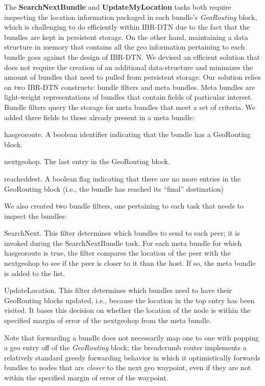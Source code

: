 The {\bf SearchNextBundle} and {\bf UpdateMyLocation} tasks both require inspecting the location information packaged in each bundle's {\em GeoRouting} block, which is challenging to do efficiently within IBR-DTN due to the fact that the bundles are kept in persistent storage. On the other hand, maintaining a data structure in memory that contains all the geo information pertaining to each bundle goes against the design of IBR-DTN. We devised an efficient solution that does not require the creation of an additional data-structure and minimizes the amount of bundles that need to pulled from persistent storage.  Our solution relies on two IBR-DTN constructs: {\sc bundle filters} and {\sc meta bundles}. {\sc Meta bundles} are light-weight representations of bundles that contain fields of particular interest. {\sc Bundle filters} query the storage for meta bundles that meet a set of criteria. We added three fields to those already present in a {\sc meta bundle}:
\begin{description*}
\item[hasgeoroute.] A boolean identifier indicating that the bundle has a {\sc GeoRouting} block.
\item[nextgeohop.] The last entry in the {\sc GeoRouting} block.
\item[reacheddest.] A boolean flag indicating that there are no more entries in the {\sc GeoRouting} block (i.e., the bundle has reached its ``final'' destination)
\end{description*}

We also created two {\sc bundle filters}, one pertaining to each task that needs to inspect the bundles:
\begin{description*}
\item[SearchNext.] This filter determines which bundles to send to each peer; it is invoked during the {\sc SearchNextBundle} task. For each {\sc meta bundle} for which {\sc hasgeoroute} is {\sc true}, the filter compares the location of the peer with the {\sc nextgeohop} to see if the peer is closer to it than the host. If so, the meta bundle is added to the list.
\item[UpdateLocation.] This filter determines which bundles need to have their {\sc GeoRouting} blocks updated, i.e., because the location in the top entry has been visited. It bases this decision on whether the location of the node is within the specified margin of error of the {\sc nextgeohop} from the meta bundle.
\end{description*}
Note that forwarding a bundle does not necessarily map one to one with popping a geo entry off of the {\em GeoRouting} block; the {\sc breadcrumb} router implements a relatively standard greedy forwarding behavior in which it optimistically forwards bundles to nodes that are {\em closer} to the next geo waypoint, even if they are not within the specified margin of error of the waypoint.


